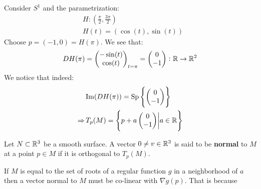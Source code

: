 \documentclass[11pt,a4paper]{article}
\begin{document}
\begin{example}
  Consider $S^1$ and the parametrization:
  \begin{align*}
    &H \colon \left(\frac{\pi}{2}, \frac{3\pi}{2}\right) \\
    &H(t) = (\cos(t), \sin(t))
  \end{align*}
  Choose $p = (-1,0) = H(\pi)$. We see that:
  \[
    DH(\pi) = 
    \begin{pmatrix}
      -\sin(t)\\
      \cos(t)\\
    \end{pmatrix}_{t=\pi} = 
    \begin{pmatrix}
      0\\
      -1\\
    \end{pmatrix} \colon \mathbb{R} \to \mathbb{R}^2
  \]
  We notice that indeed:
  \begin{align*}
    &\mathrm{Im}(DH(\pi)) = \mathrm{Sp}
    \left\{\begin{pmatrix}
      0\\
      -1\\
    \end{pmatrix}\right\} \\
    \Rightarrow \,&T_p(M) =
    \left\{p + a\begin{pmatrix}
      0\\
      -1\\
    \end{pmatrix} \biggr\vert a \in \mathbb{R} \right\}
  \end{align*}
\end{example}
\begin{definition}
  Let $N \subset \mathbb{R}^3$ be a smooth surface. A vector 
  $0 \neq v \in \mathbb{R}^3$ is said to be \textbf{normal} to $M$ at a 
  point $p \in M$ if it is orthogonal to $T_p(M)$.
\end{definition}
\begin{remark}
  If $M$ is equal to the set of roots of a regular function $g$
  in a neighborhood of $a$ then a vector normal to $M$ must be 
  co-linear with $\nabla g(p)$. 
  That is because
\end{remark}

\newpage
\end{document}
